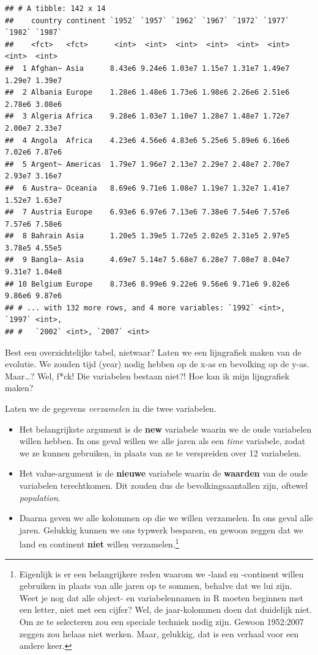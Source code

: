 \documentclass[]{tufte-book}
\providecommand{\tightlist}{%
  \setlength{\itemsep}{0pt}\setlength{\parskip}{0pt}}
\begin{document}
\begin{verbatim}
## # A tibble: 142 x 14
##    country continent `1952` `1957` `1962` `1967` `1972` `1977` `1982` `1987`
##    <fct>   <fct>      <int>  <int>  <int>  <int>  <int>  <int>  <int>  <int>
##  1 Afghan~ Asia      8.43e6 9.24e6 1.03e7 1.15e7 1.31e7 1.49e7 1.29e7 1.39e7
##  2 Albania Europe    1.28e6 1.48e6 1.73e6 1.98e6 2.26e6 2.51e6 2.78e6 3.08e6
##  3 Algeria Africa    9.28e6 1.03e7 1.10e7 1.28e7 1.48e7 1.72e7 2.00e7 2.33e7
##  4 Angola  Africa    4.23e6 4.56e6 4.83e6 5.25e6 5.89e6 6.16e6 7.02e6 7.87e6
##  5 Argent~ Americas  1.79e7 1.96e7 2.13e7 2.29e7 2.48e7 2.70e7 2.93e7 3.16e7
##  6 Austra~ Oceania   8.69e6 9.71e6 1.08e7 1.19e7 1.32e7 1.41e7 1.52e7 1.63e7
##  7 Austria Europe    6.93e6 6.97e6 7.13e6 7.38e6 7.54e6 7.57e6 7.57e6 7.58e6
##  8 Bahrain Asia      1.20e5 1.39e5 1.72e5 2.02e5 2.31e5 2.97e5 3.78e5 4.55e5
##  9 Bangla~ Asia      4.69e7 5.14e7 5.68e7 6.28e7 7.08e7 8.04e7 9.31e7 1.04e8
## 10 Belgium Europe    8.73e6 8.99e6 9.22e6 9.56e6 9.71e6 9.82e6 9.86e6 9.87e6
## # ... with 132 more rows, and 4 more variables: `1992` <int>, `1997` <int>,
## #   `2002` <int>, `2007` <int>
\end{verbatim}

Best een overzichtelijke tabel, nietwaar? Laten we een lijngrafiek maken van de evolutie. We zouden tijd (year) nodig hebben op de x-as en bevolking op de y-as. Maar\ldots? Wel, f*ck! Die variabelen bestaan niet?! Hoe kan ik mijn lijngrafiek maken?

Laten we de gegevens \emph{verzamelen} in die twee variabelen.

\begin{itemize}
\tightlist
\item
  Het belangrijkste argument is de \textbf{new} variabele waarin we de oude variabelen willen hebben. In ons geval willen we alle jaren als een \emph{time} variabele, zodat we ze kunnen gebruiken, in plaats van ze te verspreiden over 12 variabelen.
\item
  Het value-argument is de \textbf{nieuwe} variabele waarin de \textbf{waarden} van de oude variabelen terechtkomen. Dit zouden dus de bevolkingsaantallen zijn, oftewel \emph{population}.
\item
  Daarna geven we alle kolommen op die we willen verzamelen. In ons geval alle jaren. Gelukkig kunnen we ons typwerk besparen, en gewoon zeggen dat we land en continent \textbf{niet} willen verzamelen.\footnote{Eigenlijk is er een belangrijkere reden waarom we -land en -continent willen gebruiken in plaats van alle jaren op te sommen, behalve dat we lui zijn. Weet je nog dat alle object- en variabelennamen in R moeten beginnen met een letter, niet met een cijfer? Wel, de jaar-kolommen doen dat duidelijk niet. Om ze te selecteren zou een speciale techniek nodig zijn. Gewoon 1952:2007 zeggen zou helaas niet werken. Maar, gelukkig, dat is een verhaal voor een andere keer.}
\end{itemize}
\end{document}
